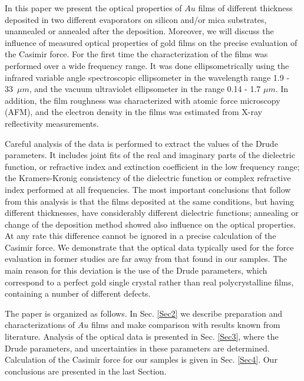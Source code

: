 \documentclass[prb]{revtex4}%
\begin{document}
In this paper we present the optical properties of $Au$ films of
different thickness deposited in two different evaporators on
silicon and/or mica substrates, unannealed or annealed after the
deposition. Moreover, we will discuss the influence of measured
optical properties of gold films on the precise evaluation of the
Casimir force. For the first time the characterization of the films
was performed over a wide frequency range. It was done
ellipsometrically using the infrared variable angle spectroscopic
ellipsometer in the wavelength range 1.9 - 33~$\mu m$, and the
vacuum ultraviolet ellipsometer in the range 0.14 - 1.7 $\mu m$. In
addition, the film roughness was characterized with atomic force
microscopy (AFM), and the electron density in the films was
estimated from X-ray reflectivity measurements.

Careful analysis of the data is performed to extract the values of
the Drude parameters. It includes joint fits of the real and
imaginary parts of the dielectric function, or refractive index and
extinction coefficient in the low frequency range; the
Kramers-Kronig consistency of the dielectric function or complex
refractive index performed at all frequencies. The most important
conclusions that follow from this analysis is that the films
deposited at the same conditions, but having different thicknesses,
have considerably different dielectric functions; annealing or
change of the deposition method showed also influence on the optical
properties. At any rate this difference cannot be ignored in a
precise calculation of the Casimir force. We demonstrate that the
optical data typically used for the force evaluation in former
studies are far away from that found in our samples. The main reason
for this deviation is the use of the Drude parameters, which
correspond to a perfect gold single crystal rather than real
polycrystalline films, containing a number of different defects.

The paper is organized as follows. In Sec. \ref{Sec2} we describe
preparation and characterizations of $Au$ films and make comparison
with results known from literature. Analysis of the optical data is
presented in Sec. \ref{Sec3}, where the Drude parameters, and
uncertainties in these parameters are determined. Calculation of the
Casimir force for our samples is given in Sec. \ref{Sec4}. Our
conclusions are presented in the last Section.

\end{document}

